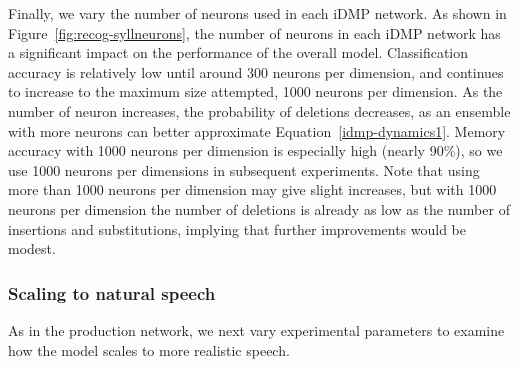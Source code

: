 
Finally, we vary the number of neurons
used in each iDMP network.
As shown in Figure~\ref{fig:recog-syllneurons},
the number of neurons in each iDMP network
has a significant impact on the performance
of the overall model.
Classification accuracy is relatively low
until around 300 neurons per dimension,
and continues to increase
to the maximum size attempted,
1000 neurons per dimension.
As the number of neuron increases,
the probability of deletions decreases,
as an ensemble with more neurons
can better approximate Equation~\eqref{idmp-dynamics1}.
Memory accuracy with 1000 neurons per dimension
is especially high (nearly 90\%),
so we use 1000 neurons per dimensions
in subsequent experiments.
Note that using more than 1000 neurons per dimension
may give slight increases,
but with 1000 neurons per dimension
the number of deletions is already
as low as the number of insertions
and substitutions,
implying that further improvements
would be modest.

\subsubsection{Scaling to natural speech}

As in the production network,
we next vary experimental parameters
to examine how the model scales
to more realistic speech.


